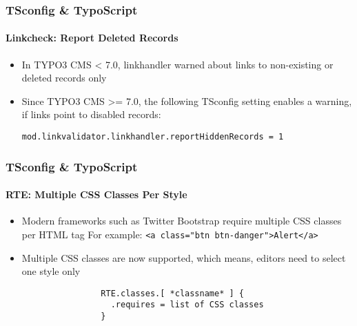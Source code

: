 \begin{frame}[fragile]
	\frametitle{TSconfig \& TypoScript}
	\framesubtitle{Linkcheck: Report Deleted Records}

	\begin{itemize}
		\item In TYPO3 CMS < 7.0, linkhandler warned about links to non-existing or deleted records only
		\item Since TYPO3 CMS >=  7.0, the following TSconfig setting enables a warning, if links point to disabled records:

			\lstinline!mod.linkvalidator.linkhandler.reportHiddenRecords = 1!

	\end{itemize}

\end{frame}


\begin{frame}[fragile]
	\frametitle{TSconfig \& TypoScript}
	\framesubtitle{RTE: Multiple CSS Classes Per Style}

	\begin{itemize}
		\item Modern frameworks such as Twitter Bootstrap require multiple CSS classes per HTML tag\newline
			\small For example: \texttt{<a class="btn btn-danger">Alert</a>}\normalsize
		\item Multiple CSS classes are now supported, which means, editors need to select one style only

			\begin{lstlisting}
				RTE.classes.[ *classname* ] {
				  .requires = list of CSS classes
				}
			\end{lstlisting}

	\end{itemize}

\end{frame}


